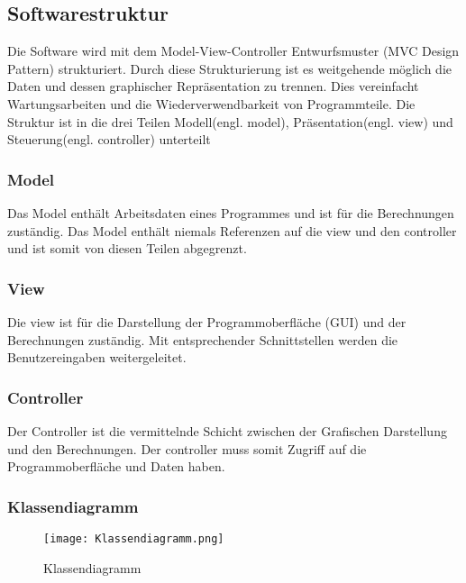 \newpage

\subsection{Softwarestruktur} \label{subsec:softwarestruktur}

Die Software wird mit dem Model-View-Controller Entwurfsmuster (MVC Design Pattern) \cite{MVCDesignPattern} strukturiert. Durch diese Strukturierung ist es weitgehende möglich die Daten und dessen graphischer Repräsentation zu trennen. Dies vereinfacht Wartungsarbeiten und die Wiederverwendbarkeit von Programmteile. Die Struktur ist in die drei Teilen Modell(engl. model), Präsentation(engl. view) und Steuerung(engl. controller) unterteilt

\subsubsection{Model} \label{subsubsec:model}

Das Model enthält Arbeitsdaten eines Programmes und ist für die Berechnungen zuständig. Das Model enthält niemals Referenzen auf die view und den controller und ist somit von diesen Teilen abgegrenzt.

\subsubsection{View} \label{subsubsec:model}

Die view ist für die Darstellung der Programmoberfläche (GUI) und der Berechnungen zuständig. Mit entsprechender Schnittstellen werden die Benutzereingaben weitergeleitet.

\subsubsection{Controller} \label{subsubsec:model}

Der Controller ist die vermittelnde Schicht zwischen der Grafischen Darstellung und den Berechnungen. Der controller muss somit Zugriff auf die Programmoberfläche und Daten haben.

\newpage 

\subsubsection{Klassendiagramm} \label{subsubsec:model}

\begin{figure}[H]
	\centering
	\texttt{[image: Klassendiagramm.png]}
	\caption{Klassendiagramm}
	\label{fig:Klassendiagramm}
\end{figure} 

